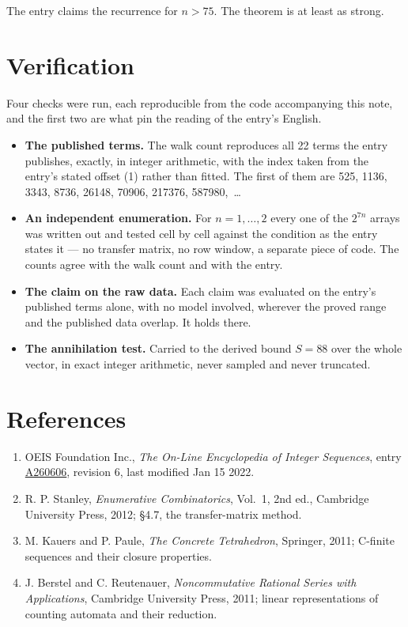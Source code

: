 \documentclass[11pt]{article}
\theoremstyle{definition}
\begin{document}
The entry claims the recurrence for $n > 75$. The theorem is at least as strong.

\section{Verification}

Four checks were run, each reproducible from the code accompanying this note, and the first two are what pin the reading of the entry's English.

\begin{itemize}

\item {\bfseries The published terms.} The walk count reproduces all 22 terms the entry publishes, exactly, in integer arithmetic, with the index taken from the entry's stated offset (1) rather than fitted. The first of them are 525, 1136, 3343, 8736, 26148, 70906, 217376, 587980,~\dots

\item {\bfseries An independent enumeration.} For $n = 1,\dots,2$ every one of the $2^{7n}$ arrays was written out and tested cell by cell against the condition as the entry states it --- no transfer matrix, no row window, a separate piece of code. The counts agree with the walk count and with the entry.

\item {\bfseries The claim on the raw data.} Each claim was evaluated on the entry's published terms alone, with no model involved, wherever the proved range and the published data overlap. It holds there.

\item {\bfseries The annihilation test.} Carried to the derived bound $S = 88$ over the whole vector, in exact integer arithmetic, never sampled and never truncated.

\end{itemize}

\section{References}

\begin{enumerate}

\item OEIS Foundation Inc., \emph{The On-Line Encyclopedia of Integer Sequences}, entry \href{https://oeis.org/A260606}{A260606}, revision 6, last modified Jan 15 2022.

\item R. P. Stanley, \emph{Enumerative Combinatorics}, Vol.~1, 2nd ed., Cambridge University Press, 2012; \S4.7, the transfer-matrix method.

\item M. Kauers and P. Paule, \emph{The Concrete Tetrahedron}, Springer, 2011; C-finite sequences and their closure properties.

\item J. Berstel and C. Reutenauer, \emph{Noncommutative Rational Series with Applications}, Cambridge University Press, 2011; linear representations of counting automata and their reduction.

\end{enumerate}
\end{document}
